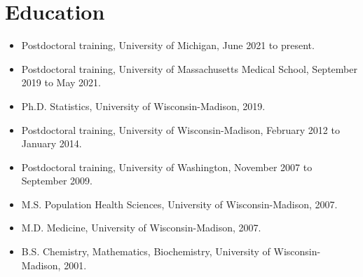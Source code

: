 \section*{Education}

\begin{itemize}
  \item Postdoctoral training, University of Michigan, June 2021 to present.  
  \item Postdoctoral training, University of Massachusetts Medical School, September 2019 to May 2021.  
  \item Ph.D. Statistics, University of Wisconsin-Madison, 2019.  
  \item Postdoctoral training, University of Wisconsin-Madison, February 2012 to January 2014.  
  \item Postdoctoral training, University of Washington, November 2007 to September 2009.  
  \item M.S. Population Health Sciences, University of Wisconsin-Madison, 2007.  
  \item M.D. Medicine, University of Wisconsin-Madison, 2007.  
  \item B.S. Chemistry, Mathematics, Biochemistry, University of Wisconsin-Madison, 2001.  
\end{itemize}
